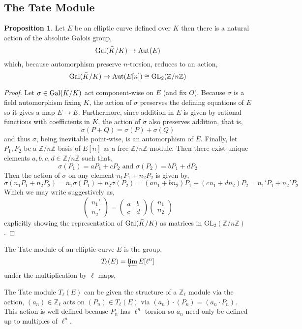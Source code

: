 \documentclass[12pt]{article}
\newcommand{\Z}{\mathbb{Z}}
\newcommand{\Gal}[1]{\mathrm{Gal} \small(#1 \small)}
\newcommand{\Aut}[1]{\mathrm{Aut} \small(#1 \small)}
\newcommand{\GL}[2]{\mathrm{GL}_{#1}(#2)}
\theoremstyle{remark}
\theoremstyle{definition}
\newtheorem{proposition}[theorem]{Proposition}
\newenvironment{definition}[1][Definition:]{\begin{trivlist}
\item[\hskip \labelsep {\bfseries #1}]}{\end{trivlist}}
\begin{document}
\subsection{The Tate Module}

\begin{proposition}
Let $E$ be an elliptic curve defined over $K$ then there is a natural action of the absolute Galois group,
\[ \Gal{\bar{K} / K} \to \Aut{E} \]
which, because automorphism preserve $n$-torsion, reduces to an action,
\[ \Gal{\bar{K} / K} \to \Aut{E[n]} \cong \GL{2}{\Z / n \Z} \] 
\end{proposition}

\begin{proof}
Let $\sigma \in \Gal{\bar{K} / K}$ act component-wise on $E$ (and fix $O$). Because $\sigma$ is a field automorphism fixing $K$, the action of $\sigma$ preserves the defining equations of $E$ so it gives a map $E \to E$. Furthermore, since addition in $E$ is given by rational functions with coefficients in $K$, the action of $\sigma$ also preserves addition, that is,
\[\sigma(P + Q) = \sigma(P) + \sigma(Q)\] 
and thus $\sigma$, being inevitable point-wise, is an automorphism of $E$. Finally, let $P_1, P_2$ be a $\Z/ n \Z$-basis of $E[n]$ as a free $\Z / n \Z$-module. Then there exist unique elements $a, b, c, d \in \Z / n \Z$ such that,
\[ \sigma(P_1) = a P_1 + c P_2 \text{  and  } \sigma(P_2) = b P_1 + d P_2 \] 
Then the action of $\sigma$ on any element $n_1 P_1 + n_2 P_2$ is given by,
\[ \sigma(n_1 P_1 + n_2 P_2) = n_1 \sigma(P_1) + n_2 \sigma(P_2) = (a n_1 + b n_2) P_1 + (c n_1 + d n_2) P_2 = n_1' P_1 + n_2' P_2 \]
Which we may write suggestively as,
\[
\begin{pmatrix}
n_1'
\\
n_2'
\end{pmatrix} 
= 
\begin{pmatrix}
a & b 
\\
c & d
\end{pmatrix}
\begin{pmatrix}
n_1 
\\
n_2
\end{pmatrix}\]
explicitly showing the representation of $\Gal{\bar{K} / K}$ as matrices in $\GL{2}{\Z / n \Z}$. 
\end{proof}

\begin{definition}
The Tate module of an elliptic curve $E$ is the group,
\[T_{\ell}(E) = \varprojlim E[\ell^n]\]
under the multiplication by $\ell$ maps,
\begin{center}
\end{center}
The Tate module $T_{\ell}(E)$ can be given the structure of a $\Z_{\ell}$ module via the action, $(a_n) \in \Z_{\ell}$ acts on $(P_n) \in T_{\ell}(E)$ via $(a_n) \cdot (P_n) = (a_n \cdot P_n)$. This action is well defined because $P_n$ has $\ell^n$ torsion so $a_n$ need only be defined up to multiples of $\ell^n$.  
\end{definition}
\end{document}
